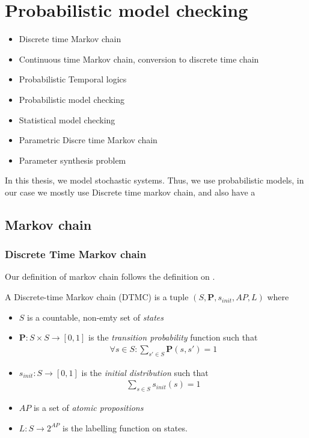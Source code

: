 \chapter{Probabilistic model checking}
 {\color{red}
  \begin{itemize}
      \item Discrete time Markov chain
      \item Continuous time Markov chain, conversion to discrete time chain
      \item Probabilistic Temporal logics
      \item Probabilistic model checking
      \item Statistical model checking
      \item Parametric Discre time Markov chain
      \item Parameter synthesis problem
  \end{itemize}
 }

In this thesis, we model stochastic systems. Thus, we use probabilistic models, in our case we mostly use Discrete time markov chain, and also have a

\section{Markov chain}
\subsection{Discrete Time Markov chain}
Our definition of markov chain follows the definition on \cite{baier2008principles}.
\begin{definition}
    A Discrete-time Markov chain (DTMC) is a tuple $(S,\mathbf{P}, s_{init}, AP, L)$ where
    \begin{itemize}
        \item $S$ is a countable, non-emty set of \textit{states}
        \item $\mathbf{P}:S\times S \rightarrow [0,1]$ is the \textit{transition probability}
              function such that
              \begin{align*}
                  \forall s \in S : \sum_{s'\in S}\mathbf{P}(s, s') = 1
              \end{align*}
        \item $s_{init}: S \rightarrow [0,1]$ is the \textit{initial distribution} such that
              \begin{align*}
                  \sum_{s\in S}s_{init}(s) = 1
              \end{align*}
        \item $AP$ is a set of \textit{atomic propositions}
        \item $L: S \rightarrow 2^{AP}$ is the labelling function on states.
    \end{itemize}
\end{definition}


